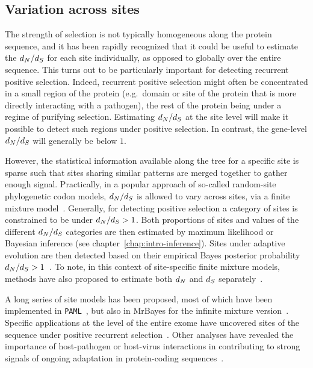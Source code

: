 \subsection{Variation across sites}
\label{subsec:variation-across-sites}

The strength of selection is not typically homogeneous along the protein sequence, and it has been rapidly recognized that it could be useful to estimate the $d_N / d_S$ for each site individually, as opposed to globally over the entire sequence.
This turns out to be particularly important for detecting recurrent positive selection.
Indeed, recurrent positive selection might often be concentrated in a small region of the protein (e.g.~domain or site of the protein that is more directly interacting with a pathogen), the rest of the protein being under a regime of purifying selection.
Estimating $d_N / d_S$ at the site level will make it possible to detect such regions under positive selection.
In contrast, the gene-level $d_N / d_S$ will generally be below $1$.

However, the statistical information available along the tree for a specific site is sparse such that sites sharing similar patterns are merged together to gather enough signal.
Practically, in a popular approach of so-called random-site phylogenetic codon models, $d_N / d_S$ is allowed to vary across sites, via a finite mixture model~\citep{Nielsen1998, Yang2000, Yang2005, Huelsenbeck2006}.
Generally, for detecting positive selection a category of sites is constrained to be under $d_N / d_S > 1$.
Both proportions of sites and values of the different $d_N / d_S$ categories are then estimated by maximum likelihood or Bayesian inference (see chapter~\ref{chap:intro-inference}).
Sites under adaptive evolution are then detected based on their empirical Bayes posterior probability $d_N / d_S > 1$~\citep{Huelsenbeck2004,Yang2005}.
To note, in this context of site-specific finite mixture models, methods have also proposed to estimate both $d_N$ and $d_S$ separately~\citep{Pond2005a, Spielman2016}.

A long series of site models has been proposed, most of which have been implemented in \texttt{PAML}~\citep{Yang1997a,Yang2007}, but also in MrBayes for the infinite mixture version~\citep{Huelsenbeck2001, Ronquist2012}.
Specific applications at the level of the entire exome have uncovered sites of the sequence under positive recurrent selection~\citep{Kosiol2008}.
Other analyses have revealed the importance of host-pathogen or host-virus interactions in contributing to strong signals of ongoing adaptation in protein-coding sequences~\citep{Enard2016}.

